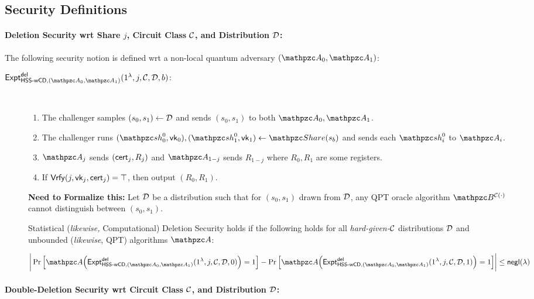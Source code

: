 \subsection{Security Definitions}

\paragraph{Deletion Security wrt Share
$j$, Circuit Class $\mathcal{C}$, and Distribution $\mathcal{D}$:}
The following security notion is defined wrt a non-local quantum
adversary $(\qA_0, \qA_1)$:

\begin{description}
\item [$\expa{\HSSwcd, (\qA_0, \qA_1)}{del}(1^\secp, j, \calC,
\calD, b)$:] $ $
\begin{enumerate}
\item The challenger samples $(s_0, s_1) \leftarrow \mathcal{D}$ and
sends $(s_0, s_1)$ to both $\qA_0, \qA_1$.
\item 
The challenger runs
$(\qsh_0^0, \vk_0), (\qsh_1^0, \vk_1) \gets \Sh(s_b)$ and sends each
$\qsh_i^0$ to $\qA_i$.

\item $\qA_j$ sends $(\mathsf{cert}_j, R_j)$ and $\qA_{1-j}$ sends $R_{1-j}$
where $R_0, R_1$ are some registers.
\item If $\mathsf{Vrfy}(j, \mathsf{vk}_j, \mathsf{cert}_j) = \top$, then output $(R_0,
R_1)$.
\end{enumerate}

\textbf{Need to Formalize this:} Let $\mathcal{D}$ be a distribution such
that for $(s_0, s_1)$ drawn from $\mathcal{D}$, any QPT oracle algorithm
$\qB^{\calC(\cdot)}$ cannot distinguish between $(s_0, s_1)$.

Statistical (\emph{likewise,} Computational) Deletion Security holds
if the
following holds for all \emph{hard-given-$\mathcal{C}$} distributions
$\mathcal{D}$ and unbounded (\emph{likewise}, QPT) algorithms $\qA$:

$$\bigg\lvert \Pr\Big[\qA\Big(\expa{\HSSwcd, (\qA_0,
\qA_1)}{del}(1^\secp, j, \calC, \calD, 0)\Big)=1\Big] -
\Pr\Big[\qA\Big(\expa{\HSSwcd, (\qA_0,
\qA_1)}{del}(1^\secp, j, \calC, \calD, 1)\Big)=1\Big]
\bigg\rvert \le \negl(\secp)$$
\end{description}

\paragraph{Double-Deletion Security wrt Circuit Class $\mathcal{C}$, and
Distribution $\mathcal{D}$:}

